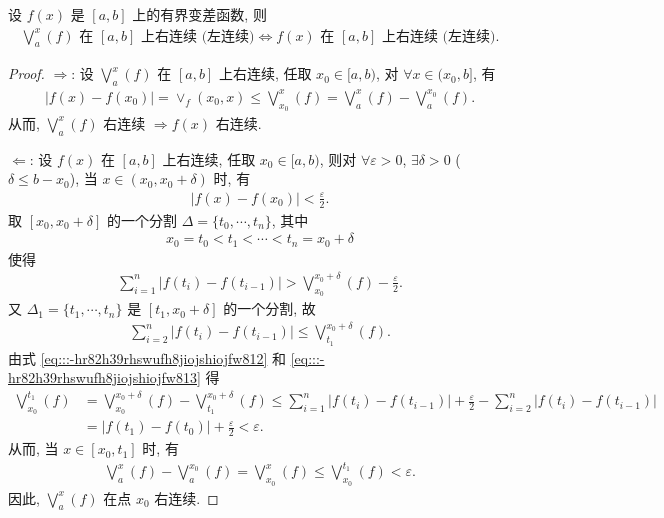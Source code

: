 \documentclass[../../main.tex]{subfiles}%
\begin{document}
\begin{theorem}
设 $f(x)$ 是 $[a,b]$ 上的有界变差函数, 则
\begin{align*}
\bigvee_a^x(f) \text{ 在 } [a,b] \text{ 上右连续 (左连续)} \iff f(x) \text{ 在 } [a,b] \text{ 上右连续 (左连续)}.
\end{align*}
\end{theorem}
\begin{proof}

$\Longrightarrow$: 设 $\bigvee_a^x(f)$ 在 $[a,b]$ 上右连续, 任取 $x_0\in[a,b)$, 对 $\forall x\in(x_0,b]$, 有
\begin{align*}
|f(x)-f(x_0)| = \vee_f(x_0,x) \leqslant \bigvee_{x_0}^x(f) = \bigvee_a^x(f) - \bigvee_a^{x_0}(f).
\end{align*}
从而, $\bigvee_a^x(f)$ 右连续 $\Rightarrow f(x)$ 右连续.

$\Longleftarrow$: 设 $f(x)$ 在 $[a,b]$ 上右连续, 任取 $x_0\in[a,b)$, 则对 $\forall\varepsilon>0$, $\exists\delta>0$ ($\delta\leqslant b-x_0$), 当 $x\in(x_0,x_0+\delta)$ 时, 有
\begin{align*}
|f(x)-f(x_0)| < \frac{\varepsilon}{2}.
\end{align*}
取 $[x_0,x_0+\delta]$ 的一个分割 $\Delta = \{t_0,\cdots,t_n\}$, 其中
\begin{align*}
x_0 = t_0 < t_1 < \cdots < t_n = x_0+\delta
\end{align*}
使得
\begin{align}
\sum_{i=1}^n |f(t_i)-f(t_{i-1})| > \bigvee_{x_0}^{x_0+\delta}(f) - \frac{\varepsilon}{2}. \label{eq:::-hr82h39rhswufh8jiojshiojfw812}
\end{align}
又 $\Delta_1 = \{t_1,\cdots,t_n\}$ 是 $[t_1,x_0+\delta]$ 的一个分割, 故
\begin{align}
\sum_{i=2}^n |f(t_i)-f(t_{i-1})| \leqslant \bigvee_{t_1}^{x_0+\delta}(f). \label{eq:::-hr82h39rhswufh8jiojshiojfw813}
\end{align}
由式 \eqref{eq:::-hr82h39rhswufh8jiojshiojfw812} 和 \eqref{eq:::-hr82h39rhswufh8jiojshiojfw813} 得
\begin{align*}
\bigvee_{x_0}^{t_1}(f) &= \bigvee_{x_0}^{x_0+\delta}(f) - \bigvee_{t_1}^{x_0+\delta}(f) 
\leqslant \sum_{i=1}^n |f(t_i)-f(t_{i-1})| + \frac{\varepsilon}{2} - \sum_{i=2}^n |f(t_i)-f(t_{i-1})| \\
&= |f(t_1)-f(t_0)| + \frac{\varepsilon}{2} < \varepsilon.
\end{align*}
从而, 当 $x\in[x_0,t_1]$ 时, 有
\begin{align*}
\bigvee_a^x(f) - \bigvee_a^{x_0}(f) = \bigvee_{x_0}^x(f) \leqslant \bigvee_{x_0}^{t_1}(f) < \varepsilon.
\end{align*}
因此, $\bigvee_a^x(f)$ 在点 $x_0$ 右连续.

\end{proof}
\end{document}

